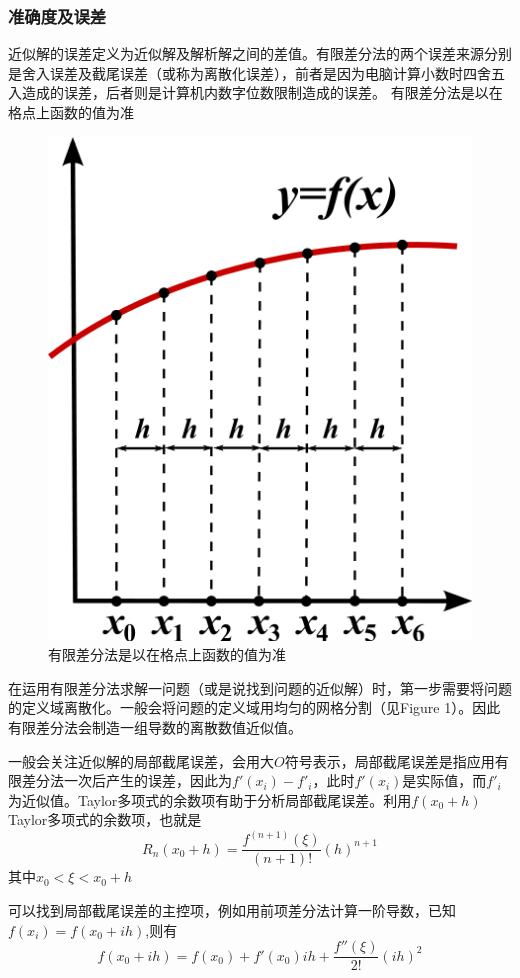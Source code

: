 \documentclass[twoside,twocolumn]{article}
\begin{document}
\begin{CJK*}{UTF8}{gkai}
	\subsubsection{准确度及误差}
	近似解的误差定义为近似解及解析解之间的差值。有限差分法的两个误差来源分别是舍入误差及截尾误差（或称为离散化误差），前者是因为电脑计算小数时四舍五入造成的误差，后者则是计算机内数字位数限制造成的误差。
	有限差分法是以在格点上函数的值为准
	
	\begin{figure}[h]
	\centering
	\includegraphics[width=0.6\linewidth]{figure/figure1}
	\caption{有限差分法是以在格点上函数的值为准}
	\label{fig:figure1}
	\end{figure}
	
	在运用有限差分法求解一问题（或是说找到问题的近似解）时，第一步需要将问题的定义域离散化。一般会将问题的定义域用均匀的网格分割（见Figure 1）。因此有限差分法会制造一组导数的离散数值近似值。
	
	一般会关注近似解的局部截尾误差，会用大$O$符号表示，局部截尾误差是指应用有限差分法一次后产生的误差，因此为$f'(x_{i})-f'_{i}$，此时$f'(x_{i})$是实际值，而$f'_{i}$为近似值。Taylor多项式的余数项有助于分析局部截尾误差。利用$f(x_{0}+h)$Taylor多项式的余数项，也就是
	\begin{equation*}
	 R_{n}(x_{0}+h)={\frac {f^{(n+1)}(\xi )}{(n+1)!}}(h)^{n+1}
	\end{equation*}
	其中$x_{0}<\xi <x_{0}+h$
	
	可以找到局部截尾误差的主控项，例如用前项差分法计算一阶导数，已知$f(x_{i})=f(x_{0}+ih)$,则有
	\begin{equation*}
	f(x_{0}+ih)=f(x_{0})+f'(x_{0})ih+{\frac {f''(\xi )}{2!}}(ih)^{2}
	\end{equation*}
	

\end{CJK*}
\end{document}
